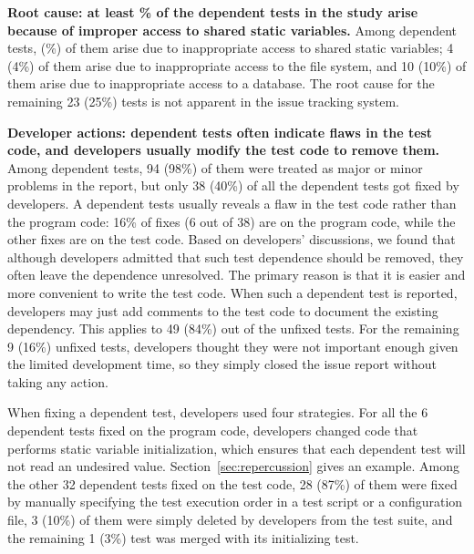 \vspace{1mm}
\noindent \textbf{{Root cause: at least \svratio\% of the dependent tests
in the study arise because of improper access to shared static
variables.}} Among \dtnum dependent tests, \svnum (\svratio\%) of them
arise due to inappropriate access to
shared static variables; 4 (4\%) of them arise
due to inappropriate access to the file system, and 10 (10\%) of them arise
due to inappropriate access to a database.
The root cause for the remaining 23 (25\%) tests is not apparent
in the issue tracking system.

\vspace{1mm}
\noindent \textbf{{Developer actions: dependent tests
often indicate flaws in the test code, and developers usually
modify the test code to remove them.}}
Among \dtnum dependent tests,
94 (98\%) of them were treated as major or minor problems in the report,
but only 38 (40\%) of all the \dtnum dependent tests
got fixed by developers. 
A dependent tests usually
reveals a flaw in the test code rather than the program code:
16\% of fixes (6 out of 38) are
on the program code, while the other fixes are on the
test code.
Based on developers' discussions, we found that although
developers admitted that such test dependence should be removed,
they often leave the dependence unresolved.
The primary reason is that
it is
easier and more convenient to write the test code. When such a dependent
test is reported, developers may just add comments to the test code
to document the existing dependency. This applies to 49 (84\%) out
of the \unfixed unfixed tests. For the remaining 9 (16\%) unfixed tests,
developers thought they were not important enough given the limited
development time, so they simply closed the issue report without taking
any action.


When fixing a dependent test, developers used
four strategies. For all the 6 dependent tests
fixed on the program code, developers changed
code that performs static variable initialization, which ensures that
each dependent test will not read an undesired value.
Section~\ref{sec:repercussion} gives an example.
Among the other 32 dependent tests fixed on the test code,
28 (87\%) of them were fixed by manually specifying
the test execution order in a test script or a configuration file,
3 (10\%) of them were simply deleted by developers
from the test suite, and the remaining 1 (3\%) test was merged with its
initializing test.



